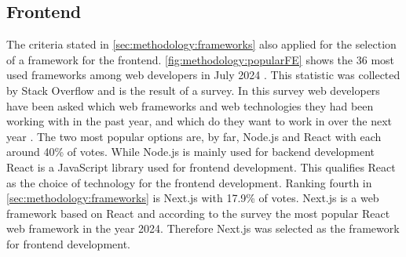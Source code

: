 \subsection{Frontend}
\label{subsec:methodology:frameworks:frontend}
The criteria stated in \autoref{sec:methodology:frameworks} also applied for the selection of a framework for the frontend. \autoref{fig:methodology:popularFE} shows the 36 most used frameworks among web developers in July 2024 \cite{frontend:popularity}. This statistic was collected by Stack Overflow and is the result of a survey. In this survey web developers have been asked which web frameworks and web technologies they had been working with in the past year, and which do they want to work in over the next year \cite{frontend:popularity}. The two most popular options are, by far, Node.js and React with each around 40\% of votes. While Node.js is mainly used for backend development React is a JavaScript library used for frontend development. This qualifies React as the choice of technology for the frontend development. Ranking fourth in \autoref{sec:methodology:frameworks} is Next.js with 17.9\% of votes. Next.js is a web framework based on React \cite{methodology:nextjs} and according to the survey the most popular React web framework in the year 2024. Therefore Next.js was selected as the framework for frontend development.
